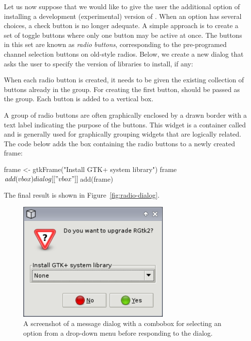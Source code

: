 \documentclass[article,shortnames]{jss}
\begin{document}
Let us now suppose that we would like to give the user the additional
option of installing a development (experimental) version of
.  When an option has several choices, a check button is no
longer adequate. A simple approach is to create a set of toggle
buttons where only one button may be active at once. The buttons in
this set are known as \emph{radio buttons}, corresponding to the
pre-programed channel selection buttons on old-style radios.  Below,
we create a new dialog that asks the user to specify the version of
  libraries to install, if any: 
When each radio button is created, it
needs to be given the existing collection of buttons already in the
group. For creating the first button,  should be passed as
the group.  Each button is added to a vertical box.

A group of radio buttons are often graphically enclosed by a drawn
border with a text label indicating the purpose of the buttons. This
widget is a container called  and is generally used for
graphically grouping widgets that are logically related. The code
below adds the box containing the radio buttons to a newly created
frame:
\begin{Code}
frame <- gtkFrame("Install GTK+ system library")
frame$add(vbox)
dialog[["vbox"]]$add(frame)
\end{Code}
The final result is shown in Figure~\ref{fig:radio-dialog}.

\begin{figure}[tbp]
  \begin{center}
    \includegraphics[width=3in]{combo-dialog.png}
    \caption{\label{fig:combo-dialog}A screenshot of a message dialog
with
      a 
      combobox for selecting an option from a drop-down menu before
      responding to
      the dialog.}
  \end{center}
\end{figure}
\end{document}
